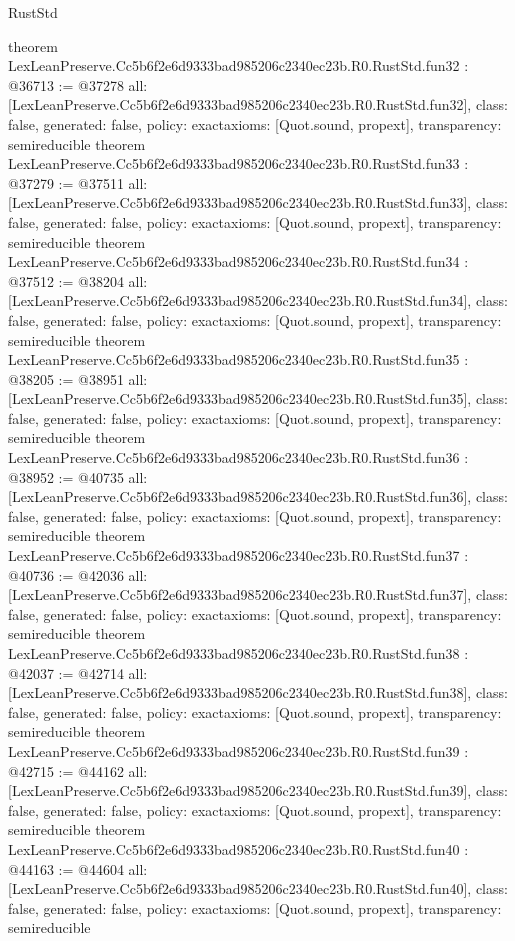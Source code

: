 \begin{lexlean}{RustStd}
\begin{coremodule}
{}
theorem LexLeanPreserve.Cc5b6f2e6d9333bad985206c2340ec23b.R0.RustStd.fun32 : @36713 := @37278 {
  all: [LexLeanPreserve.Cc5b6f2e6d9333bad985206c2340ec23b.R0.RustStd.fun32],
  class: false,
  generated: false,
  policy: exact{axioms: [Quot.sound, propext]},
  transparency: semireducible
}
theorem LexLeanPreserve.Cc5b6f2e6d9333bad985206c2340ec23b.R0.RustStd.fun33 : @37279 := @37511 {
  all: [LexLeanPreserve.Cc5b6f2e6d9333bad985206c2340ec23b.R0.RustStd.fun33],
  class: false,
  generated: false,
  policy: exact{axioms: [Quot.sound, propext]},
  transparency: semireducible
}
theorem LexLeanPreserve.Cc5b6f2e6d9333bad985206c2340ec23b.R0.RustStd.fun34 : @37512 := @38204 {
  all: [LexLeanPreserve.Cc5b6f2e6d9333bad985206c2340ec23b.R0.RustStd.fun34],
  class: false,
  generated: false,
  policy: exact{axioms: [Quot.sound, propext]},
  transparency: semireducible
}
theorem LexLeanPreserve.Cc5b6f2e6d9333bad985206c2340ec23b.R0.RustStd.fun35 : @38205 := @38951 {
  all: [LexLeanPreserve.Cc5b6f2e6d9333bad985206c2340ec23b.R0.RustStd.fun35],
  class: false,
  generated: false,
  policy: exact{axioms: [Quot.sound, propext]},
  transparency: semireducible
}
theorem LexLeanPreserve.Cc5b6f2e6d9333bad985206c2340ec23b.R0.RustStd.fun36 : @38952 := @40735 {
  all: [LexLeanPreserve.Cc5b6f2e6d9333bad985206c2340ec23b.R0.RustStd.fun36],
  class: false,
  generated: false,
  policy: exact{axioms: [Quot.sound, propext]},
  transparency: semireducible
}
theorem LexLeanPreserve.Cc5b6f2e6d9333bad985206c2340ec23b.R0.RustStd.fun37 : @40736 := @42036 {
  all: [LexLeanPreserve.Cc5b6f2e6d9333bad985206c2340ec23b.R0.RustStd.fun37],
  class: false,
  generated: false,
  policy: exact{axioms: [Quot.sound, propext]},
  transparency: semireducible
}
theorem LexLeanPreserve.Cc5b6f2e6d9333bad985206c2340ec23b.R0.RustStd.fun38 : @42037 := @42714 {
  all: [LexLeanPreserve.Cc5b6f2e6d9333bad985206c2340ec23b.R0.RustStd.fun38],
  class: false,
  generated: false,
  policy: exact{axioms: [Quot.sound, propext]},
  transparency: semireducible
}
theorem LexLeanPreserve.Cc5b6f2e6d9333bad985206c2340ec23b.R0.RustStd.fun39 : @42715 := @44162 {
  all: [LexLeanPreserve.Cc5b6f2e6d9333bad985206c2340ec23b.R0.RustStd.fun39],
  class: false,
  generated: false,
  policy: exact{axioms: [Quot.sound, propext]},
  transparency: semireducible
}
theorem LexLeanPreserve.Cc5b6f2e6d9333bad985206c2340ec23b.R0.RustStd.fun40 : @44163 := @44604 {
  all: [LexLeanPreserve.Cc5b6f2e6d9333bad985206c2340ec23b.R0.RustStd.fun40],
  class: false,
  generated: false,
  policy: exact{axioms: [Quot.sound, propext]},
  transparency: semireducible
}
\end{coremodule}
\end{lexlean}
